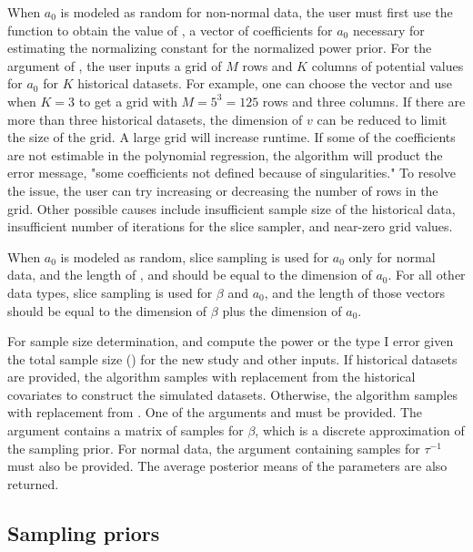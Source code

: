 When $a_0$ is modeled as random for non-normal data, the user must first use the function  to obtain the value of , a vector of coefficients for $a_0$ necessary for estimating the normalizing constant for the normalized power prior. For the  argument of , the user inputs a grid of $M$ rows and $K$ columns of potential values for $a_0$ for $K$ historical datasets. For example, one can choose the vector  and use  when $K=3$ to get a grid with $M = 5^3 = 125$ rows and three columns. If there are more than three historical datasets, the dimension of $v$ can be reduced to limit the size of the grid. A large grid will increase runtime. If some of the coefficients are not estimable in the polynomial regression, the algorithm will product the error message, "some coefficients not defined because of singularities." To resolve the issue, the user can try increasing or decreasing the number of rows in the grid. Other possible causes include insufficient sample size of the historical data, insufficient number of iterations for the slice sampler, and near-zero grid values.

When $a_0$ is modeled as random, slice sampling is used for $a_0$ only for normal data, and the length of ,  and  should be equal to the dimension of $a_0$. For all other data types, slice sampling is used for $\beta$ and $a_0$, and the length of those vectors should be equal to the dimension of $\beta$ plus the dimension of $a_0$. 

For sample size determination,  and  compute the power or the type I error given the total sample size () for the new study and other inputs. If historical datasets are provided, the algorithm samples with replacement from the historical covariates to construct the simulated datasets. Otherwise, the algorithm samples with replacement from . One of the arguments  and  must be provided. The argument  contains a matrix of samples for $\beta$, which is a discrete approximation of the sampling prior. For normal data, the argument  containing samples for $\tau^{-1}$ must also be provided. The average posterior means of the parameters are also returned.

\subsection*{Sampling priors}
\label{sec:sp}




